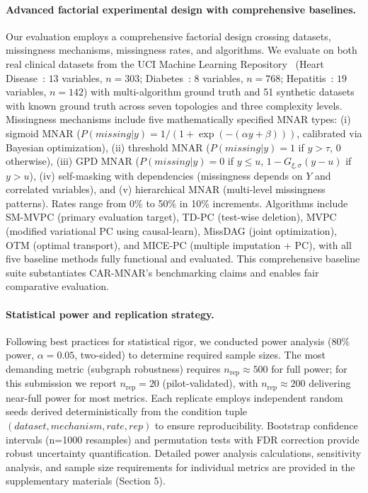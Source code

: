 \documentclass[runningheads]{llncs}
\newcommand{\Matin}{\textcolor{magenta}}
\begin{document}
\paragraph{Advanced factorial experimental design with comprehensive baselines.}
Our evaluation employs a comprehensive factorial design crossing datasets, missingness mechanisms, missingness rates, and algorithms. We evaluate on both real clinical datasets from the UCI Machine Learning Repository~\cite{kelly_uci} (Heart Disease~\cite{uci_heart_disease}: $13$ variables, $n=303$; Diabetes~\cite{smith1988pima}: $8$ variables, $n=768$; Hepatitis~\cite{uci_hepatitis}: $19$ variables, $n=142$)
with multi-algorithm ground truth and 51 synthetic datasets with known ground truth across seven topologies and three complexity levels. Missingness mechanisms include five mathematically specified MNAR types: (i) sigmoid MNAR ($P(missing|y) = 1/(1+\exp(-(\alpha y + \beta)))$, calibrated via Bayesian optimization), (ii) threshold MNAR ($P(missing|y) = 1$ if $y > \tau$, $0$ otherwise), (iii) GPD MNAR ($P(missing|y) = 0$ if $y \leq u$, $1-G_{\xi,\sigma}(y-u)$ if $y > u$), (iv) self-masking with dependencies (missingness depends on $Y$ and correlated variables), and (v) hierarchical MNAR (multi-level missingness patterns). Rates range from 0\% to 50\% in 10\% increments. Algorithms include SM-MVPC (primary evaluation target), TD-PC (test-wise deletion), MVPC (modified variational PC using causal-learn), MissDAG (joint optimization), OTM (optimal transport), and MICE-PC (multiple imputation + PC), with all five baseline methods fully functional and evaluated. This comprehensive baseline suite substantiates CAR-MNAR's benchmarking claims and enables fair comparative evaluation.

\paragraph{Statistical power and replication strategy.} 
Following best practices for statistical rigor, we conducted power analysis (80\% power, $\alpha=0.05$, two-sided) to determine required sample sizes. The most demanding metric (subgraph robustness) requires $n_{\text{rep}}\approx 500$ for full power; for this submission we report \textbf{$n_{\text{rep}}=20$} (pilot-validated), with $n_{\text{rep}}\approx 200$ delivering near-full power for most metrics. Each replicate employs independent random seeds derived deterministically from the condition tuple\\
$(dataset, mechanism, rate, rep)$ to ensure reproducibility. Bootstrap confidence intervals (n=1000 resamples) and permutation tests with FDR correction provide robust uncertainty quantification. Detailed power analysis calculations, sensitivity analysis, and sample size requirements for individual metrics are provided in the supplementary materials (Section 5).
\end{document}
